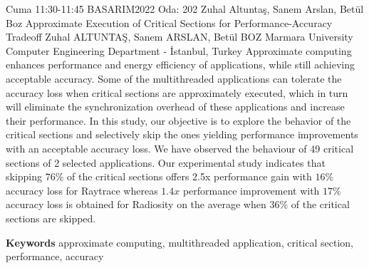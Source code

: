 
    \begin{abstract_basarim}
    {Cuma 11:30-11:45}
    {BASARIM2022}
    {Oda: 202}
    {Zuhal Altuntaş, Sanem Arslan, Betül Boz}
    {Approximate Execution of Critical Sections for Performance-Accuracy Tradeoff}
    {%
    Zuhal ALTUNTAŞ, Sanem ARSLAN, Betül BOZ}
    {%
    }
    {%
    Marmara University Computer Engineering Department - İstanbul, Turkey}
    Approximate computing enhances performance and energy efficiency of applications, while still achieving acceptable accuracy. Some of the multithreaded applications can tolerate the accuracy loss when critical sections are approximately executed, which in turn will eliminate the synchronization overhead of these applications and increase their performance. In this study, our objective is to explore the behavior of the critical sections and selectively skip the ones yielding performance improvements with an acceptable accuracy loss. We have observed the behaviour of 49 critical sections of 2 selected applications. Our experimental study indicates that skipping $76 \%$ of the critical sections offers 2.5x performance gain with $16 \%$ accuracy loss for Raytrace whereas $1.4 x$ performance improvement with $17 \%$ accuracy loss is obtained for Radiosity on the average when $36 \%$ of the critical sections are skipped. 
    
        \textbf{Keywords} \newline{}approximate computing, multithreaded application, critical section, performance, accuracy
    \end{abstract_basarim}
    